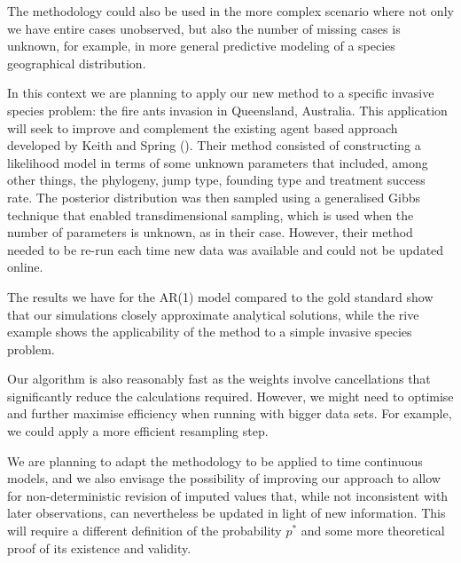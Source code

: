 The methodology could also be used in the more complex scenario where not only we have entire cases unobserved, but also the number of missing cases is unknown, {\color{blue} for example, in more general predictive modeling of a species geographical distribution.}

In this context we are planning to apply our new method to a specific invasive species problem: the fire ants invasion in Queensland, Australia. This application will seek to improve and complement the existing agent based approach developed by Keith and Spring (\cite{Keith}). {\color{blue} Their method consisted of constructing a likelihood model in terms of some unknown parameters that included, among other things, the phylogeny, jump type, founding type and treatment success rate. The posterior distribution was then sampled using a generalised Gibbs technique that enabled transdimensional sampling, which is used when the number of parameters is unknown, as in their case. However, their method needed to be re-run each time new data was available and could not be updated online.}

The results we have for the AR(1) model compared to the gold standard show that our simulations closely approximate analytical solutions, while the rive example shows the applicability of the method to a simple invasive species problem.

Our algorithm is also reasonably fast as the weights involve cancellations that significantly reduce the calculations required. However, we might need to optimise and further maximise efficiency when running with bigger data sets. For example, we could apply a more efficient resampling step.

We are planning to adapt the methodology to be applied to time continuous models, and we also envisage the possibility of improving our approach to allow for non-deterministic revision of imputed values that, while not inconsistent with later observations, can nevertheless be updated in light of new information. This will require a different definition of the probability $p^*$ and some more theoretical proof of its existence and validity. 


